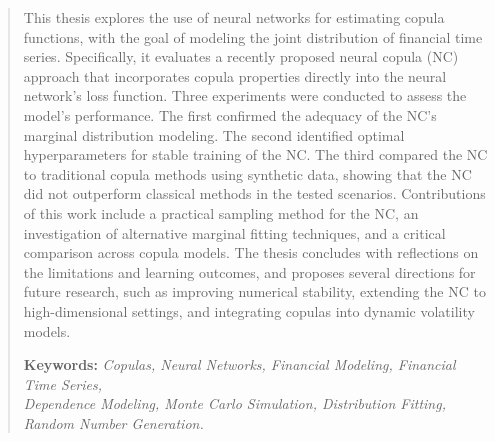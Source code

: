 \documentclass[%
a4paper,							
11pt,								
bibliography=totoc,						
abstracton=true					
]
{scrartcl}
\theoremstyle{plain}
\theoremstyle{definition}
\theoremstyle{remark}
\newcommand{\1}{\mathbbm{1}}
\begin{document}
\begin{titlepage}
\renewcommand{\thefootnote}{\arabic{footnote}}


\thispagestyle{empty}
\end{titlepage}


\begin{abstract}

    This thesis explores the use of neural networks for estimating copula functions, with the goal of modeling the joint distribution of financial time series. Specifically, it evaluates a recently proposed neural copula (NC) approach that incorporates copula properties directly into the neural network's loss function. Three experiments were conducted to assess the model’s performance. The first confirmed the adequacy of the NC's marginal distribution modeling. The second identified optimal hyperparameters for stable training of the NC. The third compared the NC to traditional copula methods using synthetic data, showing that the NC did not outperform classical methods in the tested scenarios. Contributions of this work include a practical sampling method for the NC, an investigation of alternative marginal fitting techniques, and a critical comparison across copula models. The thesis concludes with reflections on the limitations and learning outcomes, and proposes several directions for future research, such as improving numerical stability, extending the NC to high-dimensional settings, and integrating copulas into dynamic volatility models.

    \textbf{Keywords:} \textit{Copulas, Neural Networks, Financial Modeling, Financial Time Series,\\ Dependence Modeling, Monte Carlo Simulation, Distribution Fitting, Random Number Generation.}
\end{abstract}
\end{document}
